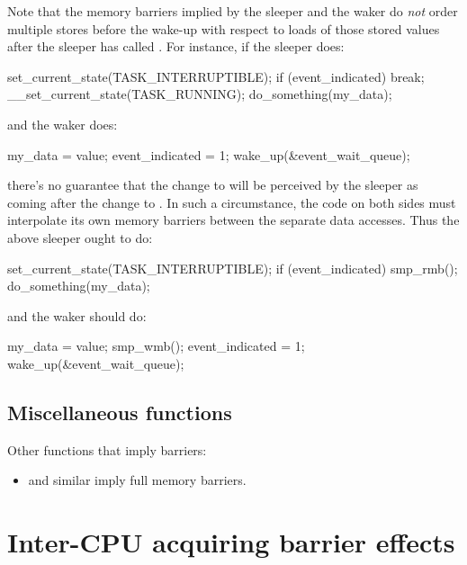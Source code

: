 \begin{Note}
Note that the memory barriers implied by the sleeper and the waker do
\emph{not} order multiple stores before the wake-up with respect to loads
of those stored values after the sleeper has called .
For instance, if the sleeper does:

\begin{VerbatimU}
	set_current_state(TASK_INTERRUPTIBLE);
	if (event_indicated)
		break;
	__set_current_state(TASK_RUNNING);
	do_something(my_data);
\end{VerbatimU}

\noindent%
and the waker does:

\begin{VerbatimU}
	my_data = value;
	event_indicated = 1;
	wake_up(&event_wait_queue);
\end{VerbatimU}

\noindent%
there's no guarantee that the change to  will be
perceived by the sleeper as coming after the change to .
In such a circumstance, the code on both sides must interpolate its own
memory barriers between the separate data accesses.
Thus the above sleeper ought to do:

\begin{VerbatimU}
	set_current_state(TASK_INTERRUPTIBLE);
	if (event_indicated) {
		smp_rmb();
		do_something(my_data);
	}
\end{VerbatimU}

\noindent%
and the waker should do:

\begin{VerbatimU}
	my_data = value;
	smp_wmb();
	event_indicated = 1;
	wake_up(&event_wait_queue);
\end{VerbatimU}
\end{Note}

\subsection{Miscellaneous functions}

Other functions that imply barriers:

\begin{itemize}
 \item {} and similar imply full memory barriers.
\end{itemize}


\section{Inter-CPU acquiring barrier effects}
\label{sec:Inter-CPU acquiring barrier effects}

